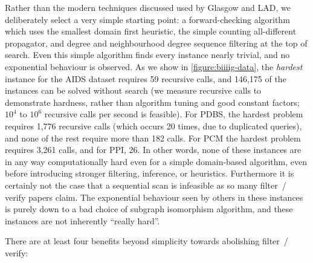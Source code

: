 \documentclass[twoside,11pt]{article}
\begin{document}
Rather than the modern techniques discussed used by Glasgow and LAD, we deliberately select a very
simple starting point: a forward-checking algorithm which uses the smallest domain first heuristic,
the simple counting all-different propagator, and degree and neighbourhood degree sequence filtering
at the top of search. Even this simple algorithm finds every instance nearly trivial, and no
exponential behaviour is observed. As we show in \cref{figure:biiiig-data}, the \emph{hardest}
instance for the AIDS dataset requires 59 recursive calls, and 146,175 of the instances can be
solved without search (we measure recursive calls to demonstrate hardness, rather than algorithm
tuning and good constant factors; $10^4$ to $10^6$ recursive calls per second is feasible).  For
PDBS, the hardest problem requires 1,776 recursive calls (which occurs 20 times, due to duplicated
queries), and none of the rest require more than 182 calls. For PCM the hardest problem requires
3,261 calls, and for PPI, 26. In other words, none of these instances are in any way computationally
hard even for a simple domain-based algorithm, even before introducing stronger filtering,
inference, or heuristics. Furthermore it is certainly not the case that a sequential scan is
infeasible as so many filter~/ verify papers claim.  The exponential behaviour seen by others in
these instances is purely down to a bad choice of subgraph isomorphism algorithm, and these
instances are not inherently ``really hard''.

There are at least four benefits beyond simplicity towards abolishing filter~/ verify:
\end{document}
